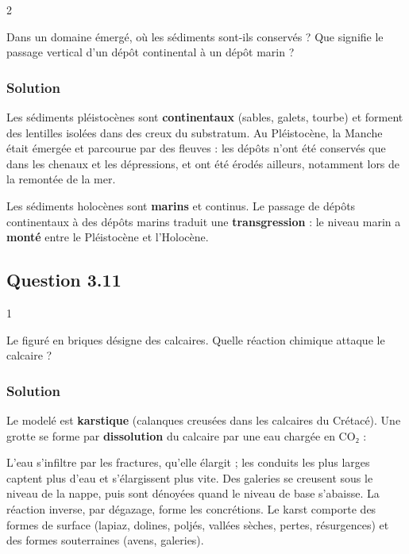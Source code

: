 \documentclass[11pt,a4paper]{article}
\newcommand{\equationajustee}[1]{%
  \sbox{\boiteequation}{$\displaystyle #1$}%
  \ifdim\wd\boiteequation>\linewidth
    \[\resizebox{\linewidth}{!}{\usebox{\boiteequation}}\]%
  \else
    \[#1\]%
  \fi}
\begin{document}
\begin{indication}{2}

Dans un domaine émergé, où les sédiments sont-ils conservés ? Que signifie le passage vertical d'un dépôt continental à un dépôt marin ?

\end{indication}

\hypertarget{solution-37}{%
\subsubsection{Solution}\label{solution-37}}

Les sédiments pléistocènes sont \textbf{continentaux} (sables, galets, tourbe) et forment des lentilles isolées dans des creux du substratum. Au Pléistocène, la Manche était émergée et parcourue par des fleuves : les dépôts n'ont été conservés que dans les chenaux et les dépressions, et ont été érodés ailleurs, notamment lors de la remontée de la mer.

Les sédiments holocènes sont \textbf{marins} et continus. Le passage de dépôts continentaux à des dépôts marins traduit une \textbf{transgression} : le niveau marin a \textbf{monté} entre le Pléistocène et l'Holocène.

\hypertarget{question-3.11}{%
\subsection{Question 3.11}\label{question-3.11}}

\begin{indication}{1}

Le figuré en briques désigne des calcaires. Quelle réaction chimique attaque le calcaire ?

\end{indication}

\hypertarget{solution-38}{%
\subsubsection{Solution}\label{solution-38}}

Le modelé est \textbf{karstique} (calanques creusées dans les calcaires du Crétacé). Une grotte se forme par \textbf{dissolution} du calcaire par une eau chargée en CO₂ :

\equationajustee{\mathrm{CaCO_3 + CO_2 + H_2O \rightleftharpoons Ca^{2+} + 2\,HCO_3^-}}

L'eau s'infiltre par les fractures, qu'elle élargit ; les conduits les plus larges captent plus d'eau et s'élargissent plus vite. Des galeries se creusent sous le niveau de la nappe, puis sont dénoyées quand le niveau de base s'abaisse. La réaction inverse, par dégazage, forme les concrétions. Le karst comporte des formes de surface (lapiaz, dolines, poljés, vallées sèches, pertes, résurgences) et des formes souterraines (avens, galeries).
\end{document}
